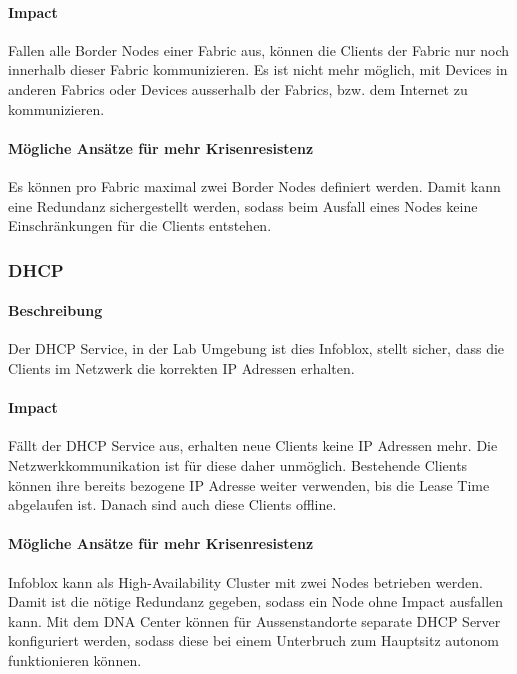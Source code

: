 \paragraph{Impact}

Fallen alle Border Nodes einer Fabric aus, können die Clients der Fabric nur noch innerhalb dieser Fabric kommunizieren. Es ist nicht mehr möglich, mit Devices in anderen Fabrics oder Devices ausserhalb der Fabrics, bzw. dem Internet zu kommunizieren.

\paragraph{Mögliche Ansätze für mehr Krisenresistenz}

Es können pro Fabric maximal zwei Border Nodes definiert werden. Damit kann eine Redundanz sichergestellt werden, sodass beim Ausfall eines Nodes keine Einschränkungen für die Clients entstehen. 

\subsubsection{DHCP}

\paragraph{Beschreibung}

Der DHCP Service, in der Lab Umgebung ist dies Infoblox, stellt sicher, dass die Clients im Netzwerk die korrekten IP Adressen erhalten.

\paragraph{Impact}

Fällt der DHCP Service aus, erhalten neue Clients keine IP Adressen mehr. Die Netzwerkkommunikation ist für diese daher unmöglich. Bestehende Clients können ihre bereits bezogene IP Adresse weiter verwenden, bis die Lease Time abgelaufen ist. Danach sind auch diese Clients offline.

\paragraph{Mögliche Ansätze für mehr Krisenresistenz}

Infoblox kann als High-Availability Cluster mit zwei Nodes betrieben werden. Damit ist die nötige Redundanz gegeben, sodass ein Node ohne Impact ausfallen kann. Mit dem DNA Center können für Aussenstandorte separate DHCP Server konfiguriert werden, sodass diese bei einem Unterbruch zum Hauptsitz autonom funktionieren können.


